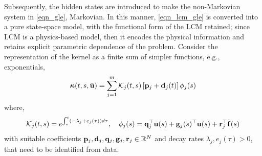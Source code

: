 Subsequently, the hidden states are introduced to make the non-Markovian system in \cref{eqn_gle}, Markovian. In this manner, \cref{eqn_lcm_gle} is converted into a pure state-space model, with the functional form of the LCM retained; since LCM is a physics-based model, then it encodes the physical information and retains explicit parametric dependence of the problem. Consider the representation of the kernel as a finite sum of simpler functions, e.g., exponentials,
\begin{equation}
    \boldsymbol{\kappa}(t,s,\bar{\mathbf{u}}) = \sum_{j=1}^{m}\mathcal{K}_j(t,s)\left[\mathbf{p}_j + \mathbf{d}_j(t)\right]\phi_j(s)
\end{equation}
where,
\begin{equation}
    \mathcal{K}_j(t,s) = e^{\int_{s}^{t}\left(-\lambda_j + e_j(\tau)\right)d\tau},\quad \phi_j(s) = \mathbf{q}_j^{\top}\bar{\mathbf{u}}(s) + \mathbf{g}_j(s)^{\top}\bar{\mathbf{u}}(s) + \mathbf{r}_j^{\top}\bar{\mathbf{f}}(s)
\end{equation}
with suitable coefficients $\mathbf{p}_j,\mathbf{d}_j,\mathbf{q}_j,\mathbf{g}_j,\mathbf{r}_j\in\mathbb{R}^{N}$ and decay rates $\lambda_j,e_j(\tau)>0$, that need to be identified from data. 

